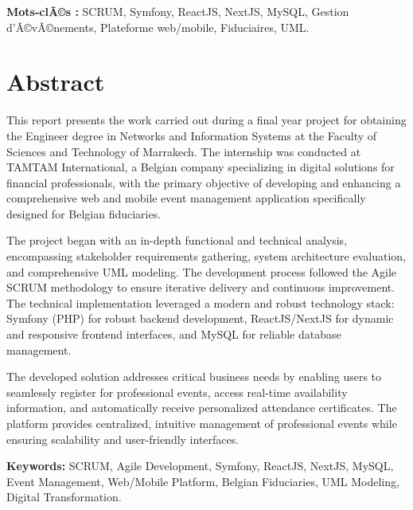 \documentclass{rapportPFEHIND}
\begin{document}
\vspace{3cm}
\textbf{Mots-clÃ©s :} SCRUM, Symfony, ReactJS, NextJS, MySQL, Gestion d'Ã©vÃ©nements, Plateforme web/mobile, Fiduciaires, UML.

\newpage

\section*{Abstract}

This report presents the work carried out during a final year project for obtaining the Engineer degree in Networks and Information Systems at the Faculty of Sciences and Technology of Marrakech. The internship was conducted at TAMTAM International, a Belgian company specializing in digital solutions for financial professionals, with the primary objective of developing and enhancing a comprehensive web and mobile event management application specifically designed for Belgian fiduciaries.

The project began with an in-depth functional and technical analysis, encompassing stakeholder requirements gathering, system architecture evaluation, and comprehensive UML modeling. The development process followed the Agile SCRUM methodology to ensure iterative delivery and continuous improvement. The technical implementation leveraged a modern and robust technology stack: Symfony (PHP) for robust backend development, ReactJS/NextJS for dynamic and responsive frontend interfaces, and MySQL for reliable database management.

The developed solution addresses critical business needs by enabling users to seamlessly register for professional events, access real-time availability information, and automatically receive personalized attendance certificates. The platform provides centralized, intuitive management of professional events while ensuring scalability and user-friendly interfaces.

\vspace{3cm}
\textbf{Keywords:} SCRUM, Agile Development, Symfony, ReactJS, NextJS, MySQL, Event Management, Web/Mobile Platform, Belgian Fiduciaries, UML Modeling, Digital Transformation.

\newpage

\end{document}
